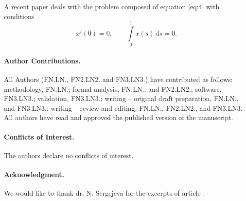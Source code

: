 \documentclass[a4paper, 10pt]{article}
\begin{document}
A recent paper \cite{sergejevaLUMII} deals with the problem composed of equation \eqref{eq:4} with conditions
%
\begin{equation} \label{eq:6}
x'(0)=0, \qquad \int\limits_0^1x(s)\,\mathrm{d}s=0.
\end{equation}

%
\paragraph{Author Contributions.} All Authors (FN.LN., FN2.LN2. and FN3.LN3.) have contributed as follows: methodology,
FN.LN.; formal analysis, FN.LN., and FN2.LN2.; software, FN3.LN3.; validation, FN3.LN3.; writing – original draft preparation, FN.LN., and FN3.LN3.; writing – review and editing, FN.LN., FN2.LN2., and FN3.LN3. All authors have read and approved the published version of the manuscript.



\paragraph{Conflicts of Interest.} The authors declare no conflicts of interest.

\paragraph{Acknowledgment.}
We would like to thank dr. N. Sergejeva for the excerpts of article \cite{2014SergejevaN}.



\end{document}
